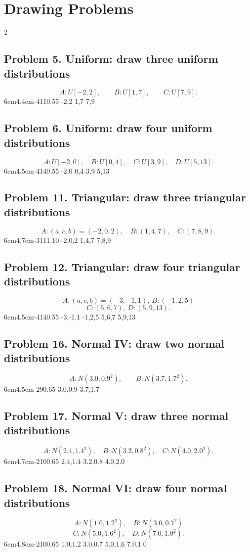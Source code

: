 \section{Drawing Problems}
\begin{multicols}{2}

\subsection*{Problem 5. Uniform: draw three uniform distributions}
\[
A:U[-2,2],\qquad B:U[1,7],\qquad C:U[7,9].
\]
\UniformThreeGraph
{6cm}{4.4cm}{-4}{11}{0.55}
{-2,2}
{1,7}
{7,9}

\subsection*{Problem 6. Uniform: draw four uniform distributions}
\[
A:U[-2,0],\quad B:U[0,4],\quad C:U[3,9],\quad D:U[5,13].
\]
\UniformFourGraph
{6cm}{4.5cm}{-4}{14}{0.55}
{-2,0}
{0,4}
{3,9}
{5,13}

\subsection*{Problem 11. Triangular: draw three triangular distributions}
\[
A:(a,c,b)=(-2,0,2),\quad B:(1,4,7),\quad C:(7,8,9).
\]
\TriangularThreeGraph
{6cm}{4.7cm}{-3}{11}{1.10}
{-2,0,2}
{1,4,7}
{7,8,9}

\subsection*{Problem 12. Triangular: draw four triangular distributions}
\[
A:(a,c,b)=(-3,-1,1),\ B:(-1,2,5)
\]
\[ C:(5,6,7),\ D:(5,9,13).
\]
\TriangularFourGraph
{6cm}{4.5cm}{-4}{14}{0.55}
{-3,-1,1}
{-1,2,5}
{5,6,7}
{5,9,13}

\subsection*{Problem 16. Normal IV: draw two normal distributions}
\[
A:N(3.0,0.9^2),\qquad B:N(3.7,1.7^2).
\]
\NormalTwoGraph
{6cm}{4.5cm}{-2}{9}{0.65}
{3.0,0.9}
{3.7,1.7}

\vspace{7cm}

\subsection*{Problem 17. Normal V: draw three normal distributions}
\[
A:N(2.4,1.4^2),\quad B:N(3.2,0.8^2),\quad C:N(4.0,2.0^2).
\]
\NormalThreeGraph
{6cm}{4.7cm}{-2}{10}{0.65}
{2.4,1.4}
{3.2,0.8}
{4.0,2.0}

\subsection*{Problem 18. Normal VI: draw four normal distributions}
\[
A:N(1.0,1.2^2),\quad B:N(3.0,0.7^2)
 \]
\[
 C:N(5.0,1.6^2),\quad D:N(7.0,1.0^2).
\]
\NormalFourGraph
{6cm}{4.8cm}{-2}{10}{0.65}
{1.0,1.2}
{3.0,0.7}
{5.0,1.6}
{7.0,1.0}

\end{multicols}

